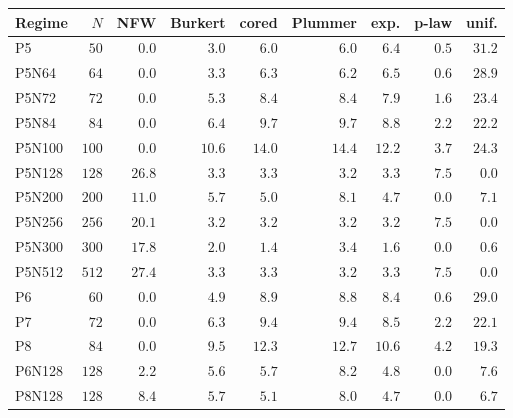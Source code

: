 \begin{tabular}{l r r r r r r r r}
\toprule
Regime & $N$ & NFW & Burkert & cored & Plummer & exp. & p-law & unif. \\
\midrule
P5 & $50$ & $\mathbf{0.0}$ & $3.0$ & $6.0$ & $6.0$ & $6.4$ & $0.5$ & $31.2$ \\
P5N64 & $64$ & $\mathbf{0.0}$ & $3.3$ & $6.3$ & $6.2$ & $6.5$ & $0.6$ & $28.9$ \\
P5N72 & $72$ & $\mathbf{0.0}$ & $5.3$ & $8.4$ & $8.4$ & $7.9$ & $1.6$ & $23.4$ \\
P5N84 & $84$ & $\mathbf{0.0}$ & $6.4$ & $9.7$ & $9.7$ & $8.8$ & $2.2$ & $22.2$ \\
P5N100 & $100$ & $\mathbf{0.0}$ & $10.6$ & $14.0$ & $14.4$ & $12.2$ & $3.7$ & $24.3$ \\
P5N128 & $128$ & $26.8$ & $3.3$ & $3.3$ & $3.2$ & $3.3$ & $7.5$ & $\mathbf{0.0}$ \\
P5N200 & $200$ & $11.0$ & $5.7$ & $5.0$ & $8.1$ & $4.7$ & $\mathbf{0.0}$ & $7.1$ \\
P5N256 & $256$ & $20.1$ & $3.2$ & $3.2$ & $3.2$ & $3.2$ & $7.5$ & $\mathbf{0.0}$ \\
P5N300 & $300$ & $17.8$ & $2.0$ & $1.4$ & $3.4$ & $1.6$ & $\mathbf{0.0}$ & $0.6$ \\
P5N512 & $512$ & $27.4$ & $3.3$ & $3.3$ & $3.2$ & $3.3$ & $7.5$ & $\mathbf{0.0}$ \\
P6 & $60$ & $\mathbf{0.0}$ & $4.9$ & $8.9$ & $8.8$ & $8.4$ & $0.6$ & $29.0$ \\
P7 & $72$ & $\mathbf{0.0}$ & $6.3$ & $9.4$ & $9.4$ & $8.5$ & $2.2$ & $22.1$ \\
P8 & $84$ & $\mathbf{0.0}$ & $9.5$ & $12.3$ & $12.7$ & $10.6$ & $4.2$ & $19.3$ \\
P6N128 & $128$ & $2.2$ & $5.6$ & $5.7$ & $8.2$ & $4.8$ & $\mathbf{0.0}$ & $7.6$ \\
P8N128 & $128$ & $8.4$ & $5.7$ & $5.1$ & $8.0$ & $4.7$ & $\mathbf{0.0}$ & $6.7$ \\
\bottomrule
\end{tabular}